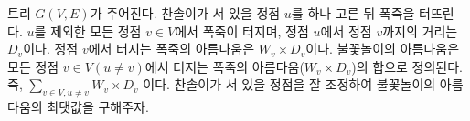 트리 $G(V, E)$가 주어진다. 찬솔이가 서 있을 정점 $u$를 하나 고른 뒤 폭죽을 터뜨린다. $u$를 제외한 모든 정점 $v\in V$에서 폭죽이 터지며, 정점 $u$에서 정점 $v$까지의 거리는 $D_v$이다.
정점 $v$에서 터지는 폭죽의 아름다움은 $W_v \times D_v$이다. 불꽃놀이의 아름다움은 모든 정점 $v\in V (u\neq v)$에서 터지는 폭죽의 아름다움($W_v \times D_v$)의 합으로 정의된다. 즉, $\sum_{v\in V, u\neq v} W_v \times D_v$ 이다. 찬솔이가 서 있을 정점을 잘 조정하여 불꽃놀이의 아름다움의 최댓값을 구해주자.
